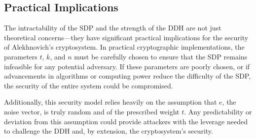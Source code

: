 \subsection{Practical Implications}

The intractability of the SDP and the strength of the DDH are not just theoretical concerns—they have significant practical implications for the security of Alekhnovich's cryptosystem. In practical cryptographic implementations, the parameters $ t $, $ k $, and $ n $ must be carefully chosen to ensure that the SDP remains infeasible for any potential adversary. If these parameters are poorly chosen, or if advancements in algorithms or computing power reduce the difficulty of the SDP, the security of the entire system could be compromised.

Additionally, this security model relies heavily on the assumption that $ e $, the noise vector, is truly random and of the prescribed weight $ t $. Any predictability or deviation from this assumption could provide attackers with the leverage needed to challenge the DDH and, by extension, the cryptosystem's security.
